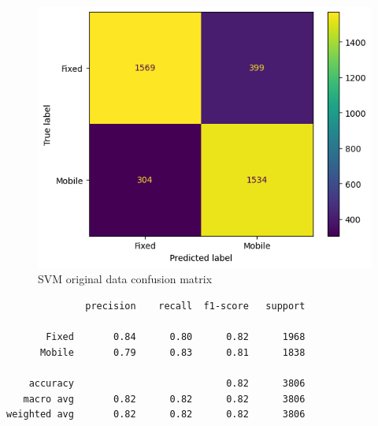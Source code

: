 \documentclass[
  letterpaper,
  DIV=11,
  numbers=noendperiod,
  oneside]{scrartcl}
\begin{document}
\begin{figure}[H]

{\centering \includegraphics{data-analytics_files/figure-latex/fig-orgvector-output-1.png}

}

\caption{\label{fig-orgvector}SVM original data confusion matrix}

\end{figure}

\begin{verbatim}
              precision    recall  f1-score   support

       Fixed       0.84      0.80      0.82      1968
      Mobile       0.79      0.83      0.81      1838

    accuracy                           0.82      3806
   macro avg       0.82      0.82      0.82      3806
weighted avg       0.82      0.82      0.82      3806
\end{verbatim}

\hfill\break
\end{document}

